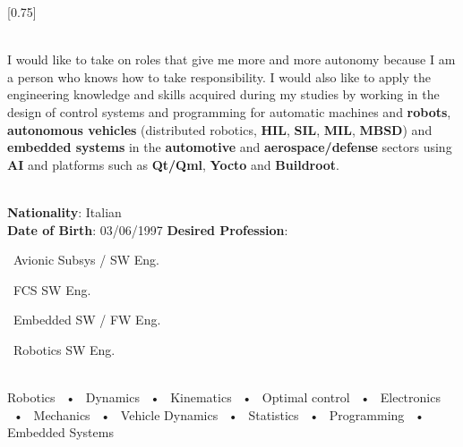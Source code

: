 \documentclass[lighthipster]{simplehipstercv}
\begin{document}
    \setlength{\columnsep}{1.5cm}
    [0.75]
    \begin{paracol}{2}
    
    \paracolbackgroundoptions
    
    
    
    
    \footnotesize
    {
    \setasidefontcolour
    \flushright
    \begin{center}
    \end{center}
    
    \\[0.5em]
        {\footnotesize 
        I would like to take on roles that give me more and more autonomy because I am a person who knows how to take
        responsibility. I would also like to apply the engineering
        knowledge and skills acquired during my studies by working in the
        design of control systems and programming for automatic
        machines and \textbf{robots}, \textbf{autonomous vehicles} (distributed robotics,
        \textbf{HIL}, \textbf{SIL}, \textbf{MIL}, \textbf{MBSD}) and \textbf{embedded systems} in the \textbf{automotive} and
        \textbf{aerospace/defense} sectors using \textbf{AI} and platforms such as \textbf{Qt/Qml},
        \textbf{Yocto} and \textbf{Buildroot}.
        }
    
    \bigskip
    
     \\[0.5em]
    \textbf{Nationality}: Italian \\
    \textbf{Date of Birth}: 03/06/1997
    \textbf{Desired Profession}: \par 
    \textbullet\ Avionic Subsys / SW Eng. \par
    \textbullet\ FCS SW Eng. \par 
    \textbullet\ Embedded SW / FW Eng. \par
    \textbullet\ Robotics SW Eng.
    
    \bigskip
    
     \\[0.5em]
    Robotics ~•~ Dynamics ~•~ Kinematics ~•~ Optimal control ~•~ Electronics ~•~ Mechanics ~•~ Vehicle Dynamics ~•~ Statistics
    ~•~ Programming ~•~ Embedded Systems 
    
}
\end{paracol}
\end{document}

